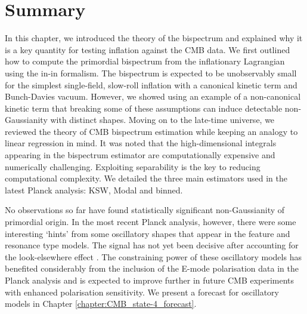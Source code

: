 \newpage
\section*{Summary}

In this chapter, we introduced the theory of the bispectrum and explained why it is a key quantity for testing inflation against the CMB data. We first outlined how to compute the primordial bispectrum from the inflationary Lagrangian using the in-in formalism. The bispectrum is expected to be unobservably small for the simplest single-field, slow-roll inflation with a canonical kinetic term and Bunch-Davies vacuum. However, we showed using an example of a non-canonical kinetic term that breaking some of these assumptions can induce detectable non-Gaussianity with distinct shapes. Moving on to the late-time universe, we reviewed the theory of CMB bispectrum estimation while keeping an analogy to linear regression in mind. It was noted that the high-dimensional integrals appearing in the bispectrum estimator are computationally expensive and numerically challenging. Exploiting separability is the key to reducing computational complexity. We detailed the three main estimators used in the latest Planck analysis: KSW, Modal and binned.

No observations so far have found statistically significant non-Gaussianity of primordial origin. In the most recent Planck analysis, however, there were some interesting `hints' from some oscillatory shapes that appear in the feature and resonance type models. The signal has not yet been decisive after accounting for the look-elsewhere effect \cite{Fergusson2015b,PlanckCollaboration2018}. The constraining power of these oscillatory models has benefited considerably from the inclusion of the E-mode polarisation data in the Planck analysis and is expected to improve further in future CMB experiments with enhanced polarisation sensitivity. We present a forecast for oscillatory models in Chapter \ref{chapter:CMB_state-4_forecast}.
